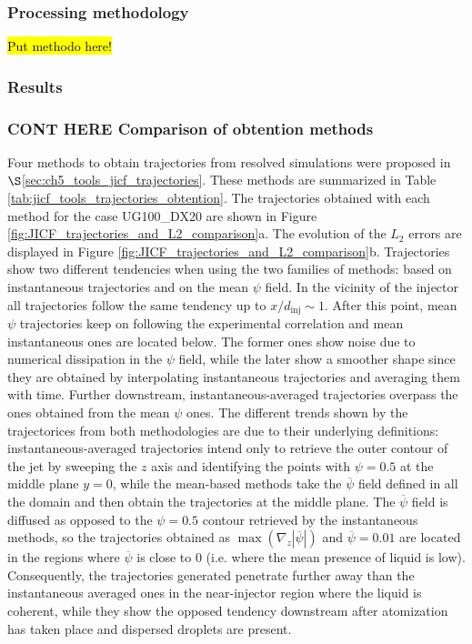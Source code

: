 \subsubsection{Processing methodology}

\hl{Put methodo here!}

\subsubsection{Results}

\subsubsection*{CONT HERE Comparison of obtention methods}

Four methods to obtain trajectories from resolved simulations were proposed in $\S$\ref{sec:ch5_tools_jicf_trajectories}. These methods are summarized in Table \ref{tab:jicf_tools_trajectories_obtention}. The trajectories obtained with each method for the case UG100\_DX20 are shown in Figure \ref{fig:JICF_trajectories_and_L2_comparison}a. The evolution of the $L_2$ errors are displayed in Figure \ref{fig:JICF_trajectories_and_L2_comparison}b. Trajectories show two different tendencies when using the two families of methods: based on instantaneous trajectories and on the mean $\psi$ field. In the vicinity of the injector all trajectories follow the same tendency up to $x/d_\mathrm{inj} \sim 1$. After this point, mean $\psi$ trajectories keep on following the experimental correlation and mean instantaneous ones are located below. The former ones show noise due to numerical dissipation in the $\psi$ field, while the later show a smoother shape since they are obtained by interpolating instantaneous trajectories and averaging them with time. Further downstream, instantaneous-averaged trajectories overpass the ones obtained from the mean $\psi$ ones. The different trends shown by the trajectorices from both methodologies are due to their underlying definitions: instantaneous-averaged trajectories intend only to retrieve the outer contour of the jet by sweeping the $z$ axis and identifying the points with $\psi = 0.5$ at the middle plane $y = 0$, while the mean-based methods take the $\overline{\psi}$ field defined in all the domain and then obtain the trajectories at the middle plane. The $\overline{\psi}$ field is diffused as opposed to the $\psi = 0.5$ contour retrieved by the instantaneous methods, so the trajectories obtained as $\max \left( \nabla_z | \overline{\psi} | \right)$ and $\overline{\psi} = 0.01$ are located in the regions where $\overline{\psi}$ is close to $0$ (i.e. where the mean presence of liquid is low). Consequently, the trajectories generated penetrate further away than the instantaneous averaged ones in the near-injector region where the liquid is coherent, while they show the opposed tendency downstream after atomization has taken place and dispersed droplets are present.


